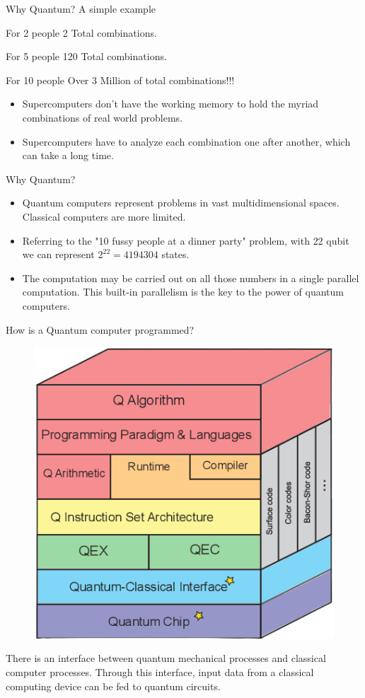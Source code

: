 \begin{frame}[<+- | only+>]{Why Quantum? A simple example}
	
	
	\begin{exampleblock}{For 2 people}
		2 Total combinations.
	\end{exampleblock}

	\begin{block}{For 5 people}
		120 Total combinations.
	\end{block}
	

	\begin{alertblock}{For 10 people}
		Over 3 Million of total combinations!!!
	\end{alertblock}	
	
	\begin{itemize}
		\item Supercomputers don't have the working \alert{memory} to hold the myriad combinations of real world problems.
		\item Supercomputers have to analyze each combination one after another, which can take a long \alert{time}.
	\end{itemize}
\end{frame}

\begin{frame}{Why Quantum?}
\begin{itemize}
 \item Quantum computers represent problems in vast multidimensional spaces. Classical computers are more limited.
 \item Referring to the "10 fussy people at a dinner party" problem, with \alert{22 qubit} we can represent $2^{22} = 4194304$ states.
    \item The computation may be carried out on all those numbers in a \alert{single parallel computation}. This built-in parallelism is the key to the power of quantum computers.
\end{itemize}
    
\end{frame}


\begin{frame}{How is a Quantum computer programmed?}
\begin{figure}[H]
    \centering
    \includegraphics[width=.4\linewidth]{Hto8a}
\end{figure}
There is an \alert{interface} between quantum mechanical processes and classical computer processes. Through this interface, input data from a classical computing device can be fed to quantum circuits.
\end{frame}


